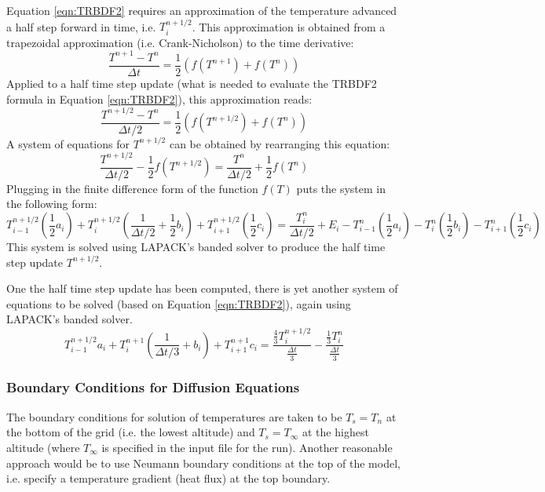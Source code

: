 \documentclass[11pt,letterpaper]{article}
\begin{document}
Equation \ref{eqn:TRBDF2} requires an approximation of the temperature advanced a half step forward in time, i.e. $T_i^{n+1/2}$.  This approximation is obtained from a trapezoidal approximation (i.e. Crank-Nicholson) to the time derivative:
\begin{equation}
\frac{T^{n+1} - T^n}{\Delta t} = \frac{1}{2} \left( f(T^{n+1}) + f(T^n) \right)
\end{equation}
Applied to a half time step update (what is needed to evaluate the TRBDF2 formula in Equation \ref{eqn:TRBDF2}), this approximation reads:
\begin{equation}
\frac{T^{n+1/2} - T^n}{\Delta t/2} = \frac{1}{2} \left( f(T^{n+1/2}) + f(T^n) \right)
\end{equation}
A system of equations for $T^{n+1/2}$ can be obtained by rearranging this equation:
\begin{equation}
\frac{T^{n+1/2}}{\Delta t/2} - \frac{1}{2} f(T^{n+1/2})= \frac{T^n}{\Delta t/2} + \frac{1}{2} f(T^n)
\end{equation}
Plugging in the finite difference form of the function $f(T)$ puts the system in the following form:
\begin{equation}
T^{n+1/2}_{i-1} \left( \frac{1}{2} a_i \right) + T^{n+1/2}_i \left( \frac{1}{\Delta t/2} + \frac{1}{2} b_i \right) + T^{n+1/2}_{i+1} \left( \frac{1}{2} c_i \right)  = \frac{T^n_i}{\Delta t/2} + E_i - T^{n}_{i-1} \left( \frac{1}{2} a_i \right) - T^{n}_i \left( \frac{1}{2} b_i \right) - T^{n}_{i+1} \left( \frac{1}{2} c_i \right) 
\end{equation}
This system is solved using LAPACK's banded solver to produce the half time step update $T^{n+1/2}$.

One the half time step update has been computed, there is yet another system of equations to be solved (based on Equation \ref{eqn:TRBDF2}), again using LAPACK's banded solver.   
\begin{equation}
T^{n+1/2}_{i-1} a_i + T^{n+1}_i \left( \frac{1}{\Delta t/3} + b_i \right) + T^{n+1}_{i+1} c_i = \frac{\frac{4}{3} T_i^{n+1/2}}{\frac{\Delta t}{3}} - \frac{\frac{1}{3} T_i^{n}}{\frac{\Delta t}{3}} \label{eqn:TRBDF2}
\end{equation}


\subsubsection{Boundary Conditions for Diffusion Equations}

The boundary conditions for solution of temperatures are taken to be $T_s=T_n$ at the bottom of the grid (i.e. the lowest altitude) and $T_s=T_\infty$ at the highest altitude (where $T_\infty$ is specified in the input file for the run).  Another reasonable approach would be to use Neumann boundary conditions at the top of the model, i.e. specify a temperature gradient (heat flux) at the top boundary. 
\end{document}
